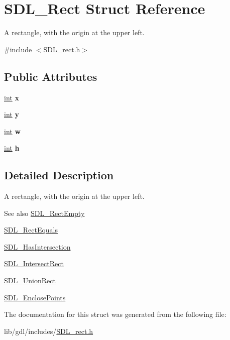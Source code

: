 \hypertarget{struct_s_d_l___rect}{}\section{S\+D\+L\+\_\+\+Rect Struct Reference}
\label{struct_s_d_l___rect}


A rectangle, with the origin at the upper left.  




{\ttfamily \#include $<$S\+D\+L\+\_\+rect.\+h$>$}

\subsection*{Public Attributes}
\begin{DoxyCompactItemize}
\item 
\hypertarget{struct_s_d_l___rect_a85418d94621dd6855805c4b5c7bf6482}{}\hyperlink{_s_d_l__thread_8h_a6a64f9be4433e4de6e2f2f548cf3c08e}{int} {\bfseries x}\label{struct_s_d_l___rect_a85418d94621dd6855805c4b5c7bf6482}

\item 
\hypertarget{struct_s_d_l___rect_a822694af8ddca5fd0d5d94e47106ab85}{}\hyperlink{_s_d_l__thread_8h_a6a64f9be4433e4de6e2f2f548cf3c08e}{int} {\bfseries y}\label{struct_s_d_l___rect_a822694af8ddca5fd0d5d94e47106ab85}

\item 
\hypertarget{struct_s_d_l___rect_a56b7be5738fb6fab86881534a814c45e}{}\hyperlink{_s_d_l__thread_8h_a6a64f9be4433e4de6e2f2f548cf3c08e}{int} {\bfseries w}\label{struct_s_d_l___rect_a56b7be5738fb6fab86881534a814c45e}

\item 
\hypertarget{struct_s_d_l___rect_a0a17d46b320af8063b746153348edd72}{}\hyperlink{_s_d_l__thread_8h_a6a64f9be4433e4de6e2f2f548cf3c08e}{int} {\bfseries h}\label{struct_s_d_l___rect_a0a17d46b320af8063b746153348edd72}

\end{DoxyCompactItemize}


\subsection{Detailed Description}
A rectangle, with the origin at the upper left. 

\begin{DoxySeeAlso}{See also}
\hyperlink{_s_d_l__rect_8h_aac0e9b5d3f34baec6a2cde95bb01f49c}{S\+D\+L\+\_\+\+Rect\+Empty} 

\hyperlink{_s_d_l__rect_8h_a156979fd3561cf90b87741d11057262a}{S\+D\+L\+\_\+\+Rect\+Equals} 

\hyperlink{_s_d_l__rect_8h_a191ec0b069421d4a36304b475697e847}{S\+D\+L\+\_\+\+Has\+Intersection} 

\hyperlink{_s_d_l__rect_8h_aff8e3dd3b1a25443cd7c8cf02a087290}{S\+D\+L\+\_\+\+Intersect\+Rect} 

\hyperlink{_s_d_l__rect_8h_a659f2c25335202888408c95195823f9c}{S\+D\+L\+\_\+\+Union\+Rect} 

\hyperlink{_s_d_l__rect_8h_afcbb58dbba760b9e6fdb4b5d1ece015c}{S\+D\+L\+\_\+\+Enclose\+Points} 
\end{DoxySeeAlso}


The documentation for this struct was generated from the following file\+:\begin{DoxyCompactItemize}
\item 
lib/gdl/includes/\hyperlink{_s_d_l__rect_8h}{S\+D\+L\+\_\+rect.\+h}\end{DoxyCompactItemize}
